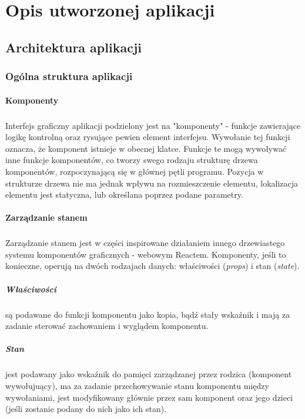 \documentclass[12pt]{report}
\begin{document}
	\chapter{Opis utworzonej aplikacji}
	\section{Architektura aplikacji}
	\subsection{Ogólna struktura aplikacji}
	\subsubsection{Komponenty}
	\paragraph{}
	Interfejs graficzny aplikacji podzielony jest na "komponenty" - funkcje zawierające logikę kontrolną oraz rysujące pewien element interfejsu. Wywołanie tej funkcji oznacza, że komponent istnieje w obecnej klatce.
	Funkcje te mogą wywoływać inne funkcje komponentów, co tworzy swego rodzaju strukturę drzewa komponentów, rozpoczynającą się w głównej pętli programu. Pozycja w strukturze drzewa nie ma jednak wpływu na rozmieszczenie elementu, lokalizacja elementu jest statyczna, lub określana poprzez podane parametry.
	
	\subsubsection{Zarządzanie stanem}
	\paragraph{}
	Zarządzanie stanem jest w części inspirowane działaniem innego drzewiastego systemu komponentów graficznych - webowym Reactem. Komponenty, jeśli to konieczne, operują na dwóch rodzajach danych: właściwości (\textit{props}) i stan (\textit{state}).
	\paragraph{Właściwości} są podawane do funkcji komponentu jako kopia, bądź stały wskaźnik i mają za zadanie sterować zachowaniem i wyglądem komponentu.
	\paragraph{Stan} jest podawany jako wskaźnik do pamięci zarządzanej przez rodzica (komponent wywołujuący), ma za zadanie przechowywanie stanu komponentu między wywołaniami, jest modyfikowany głównie przez sam komponent oraz jego dzieci (jeśli zostanie podany do nich jako ich stan).
\end{document}
